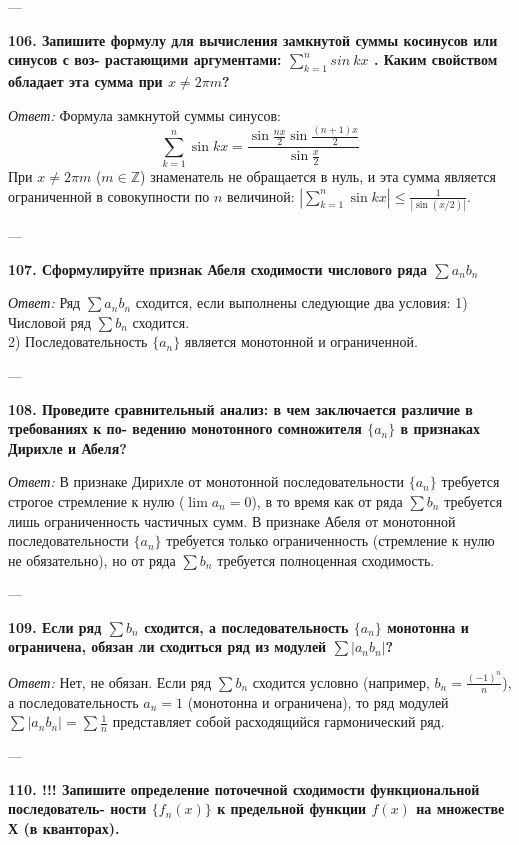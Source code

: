 \documentclass{article}
\begin{document}
---

\textbf{106. Запишите формулу для вычисления замкнутой суммы косинусов или синусов с воз- растающими аргументами: $\sum_{k=1}^{n}sin~kx$ . Каким свойством обладает эта сумма при $x\ne2\pi m$?}

\textit{Ответ:} Формула замкнутой суммы синусов:
$$ \sum_{k=1}^{n} \sin kx = \frac{\sin \frac{nx}{2} \sin \frac{(n+1)x}{2}}{\sin \frac{x}{2}} $$
При $x \neq 2\pi m$ ($m \in \mathbb{Z}$) знаменатель не обращается в нуль, и эта сумма является ограниченной в совокупности по $n$ величиной: $\left|\sum_{k=1}^n \sin kx \right| \le \frac{1}{|\sin(x/2)|}$.

---

\textbf{107. Сформулируйте признак Абеля сходимости числового ряда $\sum a_{n}b_{n}$}

\textit{Ответ:} Ряд $\sum a_n b_n$ сходится, если выполнены следующие два условия:
1) Числовой ряд $\sum b_n$ сходится. \\
2) Последовательность $\{a_n\}$ является монотонной и ограниченной.

---

\textbf{108. Проведите сравнительный анализ: в чем заключается различие в требованиях к по- ведению монотонного сомножителя $\{a_{n}\}$ в признаках Дирихле и Абеля?}

\textit{Ответ:} В признаке Дирихле от монотонной последовательности $\{a_n\}$ требуется строгое стремление к нулю ($\lim a_n = 0$), в то время как от ряда $\sum b_n$ требуется лишь ограниченность частичных сумм. В признаке Абеля от монотонной последовательности $\{a_n\}$ требуется только ограниченность (стремление к нулю не обязательно), но от ряда $\sum b_n$ требуется полноценная сходимость.

---

\textbf{109. Если ряд $\sum b_{n}$ сходится, а последовательность $\{a_{n}\}$ монотонна и ограничена, обязан ли сходиться ряд из модулей $\sum|a_{n}b_{n}|$?}

\textit{Ответ:} Нет, не обязан. Если ряд $\sum b_n$ сходится условно (например, $b_n = \frac{(-1)^n}{n}$), а последовательность $a_n = 1$ (монотонна и ограничена), то ряд модулей $\sum |a_n b_n| = \sum \frac{1}{n}$ представляет собой расходящийся гармонический ряд.

---

\textbf{110. !!! Запишите определение поточечной сходимости функциональной последователь- ности $\{f_{n}(x)\}$ к предельной функции $f(x)$ на множестве Х (в кванторах).}
\end{document}
